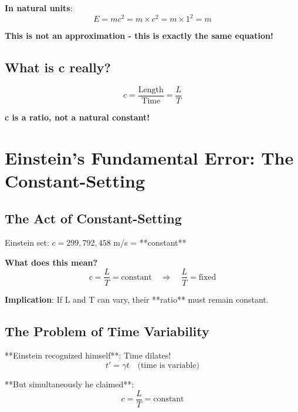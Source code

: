 \documentclass[12pt,a4paper]{article}
\begin{document}
	\textbf{In natural units}:
	\begin{equation}
		E = mc^2 = m \times c^2 = m \times 1^2 = m
	\end{equation}
	
	\textbf{This is not an approximation - this is exactly the same equation!}
	
	\subsection{What is c really?}
	
	\begin{equation}
		c = \frac{\text{Length}}{\text{Time}} = \frac{L}{T}
	\end{equation}
	
	\textbf{c is a ratio, not a natural constant!}
	
	\section{Einstein's Fundamental Error: The Constant-Setting}
	
	\subsection{The Act of Constant-Setting}
	
	Einstein set: $c = 299,792,458$ m/s = **constant**
	
	\textbf{What does this mean?}
	\begin{equation}
		c = \frac{L}{T} = \text{constant} \quad \Rightarrow \quad \frac{L}{T} = \text{fixed}
	\end{equation}
	
	\textbf{Implication}: If L and T can vary, their **ratio** must remain constant.
	
	\subsection{The Problem of Time Variability}
	
	**Einstein recognized himself**: Time dilates!
	\begin{equation}
		t' = \gamma t \quad \text{(time is variable)}
	\end{equation}
	
	**But simultaneously he claimed**: 
	\begin{equation}
		c = \frac{L}{T} = \text{constant}
	\end{equation}
	
\end{document}
